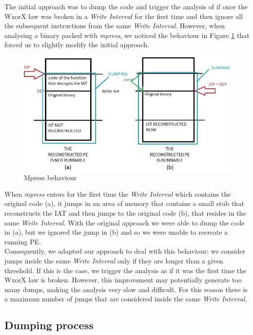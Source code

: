 The initial approach was to dump the code and trigger the analysis of if once the \ac{WxorX} law was broken in a \textit{Write Interval} for the first time and then ignore all the subsequent instructions from the same \textit{Write Interval}. However, when analysing a binary packed with \textit{mpress}, we noticed the behaviour in Figure \ref{mpress behaviour} that forced us to slightly modify the initial approach.\\
\begin{figure}[!ht]
	\begin{center}
   		\includegraphics [width=\textwidth]{./pictures/InterWriteSet Analysis - mpress.jpg}
	\end{center}
	\caption{Mpress behaviour}
	\label{mpress behaviour}
\end{figure}
When \textit{mpress} enters for the first time the \textit{Write Interval} which contains the original code (a), it jumps in an area of memory that contains a small stub that reconstructs the \ac{IAT} and then jumps to the original code (b), that resides in the same \textit{Write Interval}. With the original approach we were able to dump the code in (a), but we ignored the jump in (b) and so we were unable to recreate a running \ac{PE}.\\
Consequently, we adapted our approach to deal with this behaviour: we consider jumps inside the same \textit{Write Interval} only if they are longer than a given threshold. If this is the case, we trigger the analysis as if it was the first time the \ac{WxorX} law is broken. However, this improvement may potentially generate too many dumps, making the analysis very slow and difficult. For this reason there is a maximum number of jumps that are considered inside the same \textit{Write Interval}.


\subsection{Dumping process}
